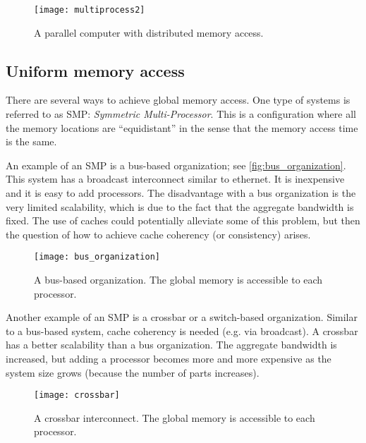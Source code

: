\begin{figure}[htbp]
  \begin{center}
    \texttt{[image: multiprocess2]}
  \end{center}
  \caption{A parallel computer with distributed memory access.}
  \label{fig:multiprocess2}
\end{figure}

\subsection{Uniform memory access}

There are several ways to achieve global memory access. One type of systems is
referred to as SMP: \emph{Symmetric Multi-Processor}. This is a configuration
where all the memory locations are ``equidistant'' in the sense that the memory
access time is the same.

An example of an SMP is a bus-based organization; see
\autoref{fig:bus_organization}. This system has a broadcast interconnect similar
to ethernet. It is inexpensive and it is easy to add processors. The
disadvantage with a bus organization is the very limited scalability, which is
due to the fact that the aggregate bandwidth is fixed. The use of caches could
potentially alleviate some of this problem, but then the question of how to
achieve cache coherency (or consistency) arises.

\begin{figure}[htbp]
  \begin{center}
    \texttt{[image: bus\_organization]}
  \end{center}
  \caption{
    A bus-based organization. The global memory is accessible to each processor.
  }
  \label{fig:bus_organization}
\end{figure}

Another example of an SMP is a crossbar or a switch-based organization. Similar
to a bus-based system, cache coherency is needed (e.g. via broadcast). A
crossbar has a better scalability than a bus organization. The aggregate
bandwidth is increased, but adding a processor becomes more and more expensive
as the system size grows (because the number of parts increases).

\begin{figure}[htbp]
  \begin{center}
    \texttt{[image: crossbar]}
  \end{center}
  \caption{
    A crossbar interconnect. The global memory is accessible to each processor.
  }
  \label{fig:crossbar}
\end{figure}

